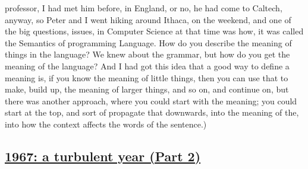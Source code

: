 \documentclass[]{article}
\begin{document}
professor, I had met him before, in England, or no, he had come to
Caltech, anyway, so Peter and I went hiking around Ithaca, on the
weekend, and one of the big questions, issues, in Computer Science at
that time was how, it was called the Semantics of programming Language.
How do you describe the meaning of things in the language? We knew about
the grammar, but how do you get the meaning of the language? And I had
got this idea that a good way to define a meaning is, if you know the
meaning of little things, then you can use that to make, build up, the
meaning of larger things, and so on, and continue on, but there was
another approach, where you could start with the meaning; you could
start at the top, and sort of propagate that downwards, into the meaning
of the, into how the context affects the words of the sentence.)

\subsection{\texorpdfstring{\href{http://webofstories.com/play/17094}{1967:
a turbulent year (Part
2)}}{1967: a turbulent year (Part 2)}}\label{a-turbulent-year-part-2}
\end{document}
